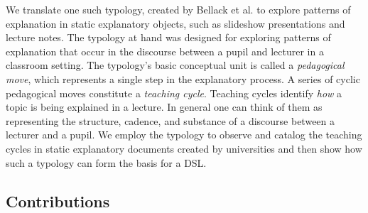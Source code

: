 \documentclass[conference]{IEEEtran}
\begin{document}
We translate one such typology, created by Bellack et
al.\cite{bellack1966language} to explore patterns of explanation in static
explanatory objects, such as slideshow presentations and lecture notes. The
typology at hand was designed for exploring patterns of explanation that occur
in the discourse between a pupil and lecturer in a classroom setting. The
typology's basic conceptual unit is called a \emph{pedagogical move}, which
represents a single step in the explanatory process. A series of cyclic
pedagogical moves constitute a \emph{teaching cycle}. Teaching cycles identify
\emph{how} a topic is being explained in a lecture. In general one can think of
them as representing the structure, cadence, and substance of a discourse
between a lecturer and a pupil. We employ the typology to observe and catalog
the teaching cycles in static explanatory documents created by universities and
then show how such a typology can form the basis for a DSL.

\subsection{Contributions}
\end{document}
